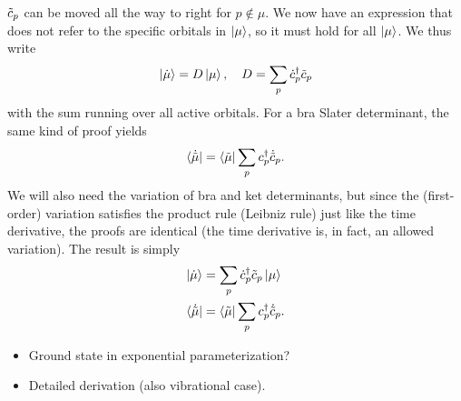 \documentclass[aip,jcp,preprint,superscriptaddress,nofootinbib]{revtex4-1}
\begin{document}
$\tilde{c}_{p}$ can be moved all the way to right for $p \notin \mu$. We now have an expression that does not refer to the specific orbitals
in $\ket{\mu}$, so it must hold for all $\ket{\mu}$. We thus write
\begin{align}
    \ket{\dot{\mu}} = D \ket{\mu}, \quad D = \sum_{p} \dot{c}^{\dagger}_{p} \tilde{c}_{p}
\end{align}
with the sum running over all active orbitals. For a bra Slater determinant, the same kind of proof yields
\begin{align}
    \bra{\dot{\tilde{\mu}}} = \bra{\tilde{\mu}} \sum_{p} c^{\dagger}_{p} \dot{\tilde{c}}_{p}.
\end{align}
We will also need the variation of bra and ket determinants, but since
the (first-order) variation satisfies the product rule (Leibniz rule) just like
the time derivative, the proofs are identical (the time derivative is, in fact,
an allowed variation). The result is simply
\begin{align}
    \ket{\dot{\mu}}         &= \sum_{p} \dot{c}^{\dagger}_{p} \tilde{c}_{p} \ket{\mu} \\
    \bra{\dot{\tilde{\mu}}} &= \bra{\tilde{\mu}} \sum_{p} c^{\dagger}_{p} \dot{\tilde{c}}_{p}.
\end{align}

\begin{itemize}
    \item Ground state in exponential parameterization?
    \item Detailed derivation (also vibrational case).
\end{itemize}

\newpage

\end{document}
